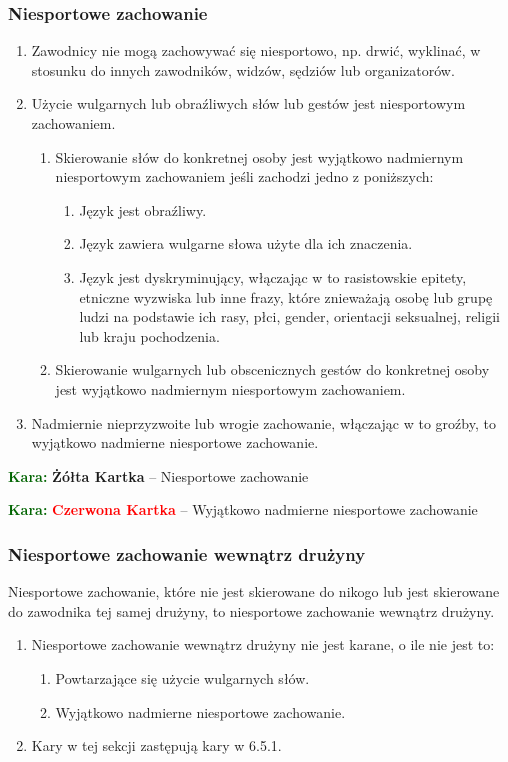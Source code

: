 \documentclass[11pt,a4paper]{article}
\newcommand\redcard[1]{\bgroup\textcolor{darkgreen}{\textbf{Kara: }}\bgroup\textcolor{red}{\textbf{Czerwona Kartka}} -- #1}
\newcommand\yellowcard[1]{\bgroup\textcolor{darkgreen}{\textbf{Kara: }}\bgroup\textcolor{darkyellow}{\textbf{Żółta Kartka}} -- #1}
\begin{document}
\subsubsection{Niesportowe zachowanie}
\begin{enumerate}
  \item Zawodnicy nie mogą zachowywać się niesportowo, np. drwić, wyklinać, w stosunku do innych zawodników, widzów, sędziów lub organizatorów.
  \item Użycie wulgarnych lub obraźliwych słów lub gestów jest niesportowym zachowaniem.
  \begin{enumerate}
    \item Skierowanie słów do konkretnej osoby jest wyjątkowo nadmiernym niesportowym zachowaniem jeśli zachodzi jedno z poniższych:
    \begin{enumerate}
      \item Język jest obraźliwy.
      \item Język zawiera wulgarne słowa użyte dla ich znaczenia.
      \item Język jest dyskryminujący, włączając w to rasistowskie epitety, etniczne wyzwiska lub inne frazy, które znieważają osobę lub grupę ludzi na podstawie ich rasy, płci, gender, orientacji seksualnej, religii lub kraju pochodzenia.
    \end{enumerate}
    \item Skierowanie wulgarnych lub obscenicznych gestów do konkretnej osoby jest wyjątkowo nadmiernym niesportowym zachowaniem.
  \end{enumerate}
  \item Nadmiernie nieprzyzwoite lub wrogie zachowanie, włączając w to groźby, to wyjątkowo nadmierne niesportowe zachowanie.
\end{enumerate}

\yellowcard{Niesportowe zachowanie}

\redcard{Wyjątkowo nadmierne niesportowe zachowanie}

\subsubsection{Niesportowe zachowanie wewnątrz drużyny}
Niesportowe zachowanie, które nie jest skierowane do nikogo lub jest skierowane do zawodnika tej samej drużyny, to niesportowe zachowanie wewnątrz drużyny.
\begin{enumerate}
  \item Niesportowe zachowanie wewnątrz drużyny nie jest karane, o ile nie jest to:
  \begin{enumerate}
    \item Powtarzające się użycie wulgarnych słów.
    \item Wyjątkowo nadmierne niesportowe zachowanie.
  \end{enumerate}
  \item Kary w tej sekcji zastępują kary w 6.5.1. %
\end{enumerate}
\end{document}
